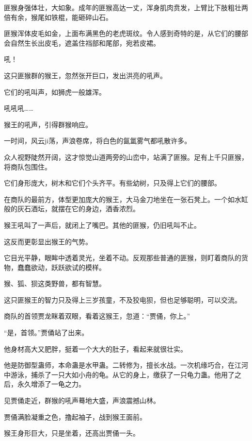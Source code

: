 
\begin{this_body}

匪猴身强体壮，大如象。成年的匪猴高达一丈，浑身肌肉贲发，上臂比下肢粗壮两倍有余，猴尾如铁棍，能砸碎山石。

匪猴浑体皮毛如金，上面布满黑色的老虎斑纹。令人感到奇特的是，从它们的腰部会自然生长出皮毛，遮盖住裆部和尾部，宛若皮裙。

吼！

这只匪猴群的猴王，忽然张开巨口，发出洪亮的吼声。

它们的吼叫声，如狮虎一般雄浑。

吼吼吼……

猴王的吼声，引得群猴响应。

一时间，风云ji荡，声浪卷席，将白色的氤氲雾气都吼散许多。

众人视野陡然开阔，这才惊觉山道两旁的山峦中，站满了匪猴。足有上千只匪猴，将商队包围住。

它们身形庞大，树木和它们个头齐平。有些幼树，只及得上它们的腰部。

在商队的最前方，体型更加庞大的猴王，大马金刀地坐在一张石凳上。一个如水缸般的灰石酒坛，就摆在它的身边，酒香浓烈。

猴王吼叫了一声后，就闭上了嘴巴。其他的匪猴，仍旧吼叫不止。

这反而更彰显出猴王的气势。

它目光平静，眼眸中透着灵光，坐着不动。反观那些普通的匪猴，则盯着商队的货物，蠢蠢欲动，跃跃欲试的模样。

猴、狐、狈这类野兽，都有智慧。

这只匪猴王的智力只及得上三岁孩童，不及狡电狈，但也足够聪明，可以交流。

商队的首领贾龙眯着双眼，看着这猴王，忽道：“贾俑，你上。”

“是，首领。”贾俑站了出来。

他身材高大又肥胖，挺着一个大大的肚子，看起来就很壮实。

他是防御型蛊师，本命蛊是水甲蛊。二转修为，擅长水战。一次机缘巧合，在江河中游泳，捕杀了一只大如小舟的龟。从它的身上，缴获了一只龟力蛊。他用了之后，永久增添了一龟之力。

见贾俑走近，群猴的吼声蓦地大盛，声浪震撼山林。

贾俑满脸凝重之色，撸起袖子，战到猴王面前。

猴王身形巨大，只是坐着，还高出贾俑一头。


\end{this_body}
